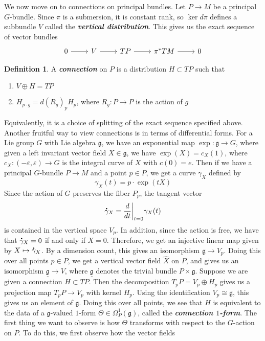 \documentclass[psamsfonts, 12pt]{amsart}
\theoremstyle{definition}
\newtheorem{defn}[thm]{Definition}
\theoremstyle{remark}
\newcommand{\ib}[1]{\textbf{\textit{#1}}}
\newcommand{\g}{\mathfrak{g}}
\newcommand*{\dt}[1]{%
   \accentset{\mbox{\large\bfseries .}}{#1}}
\begin{document}
We now move on to connections on principal bundles. Let $P \to M$ be a principal $G$-bundle.
Since $\pi$ is a submersion, it is constant rank, so $\ker d\pi$ defines a
subbundle $V$ called the \ib{vertical distribution}. This gives us the exact sequence
of vector bundles
\[\begin{tikzcd}
0 \ar[r] & V \ar[r] & TP \ar[r] & \pi^*TM \ar[r] & 0
\end{tikzcd}\]
%
\begin{defn}
A \ib{connection} on $P$ is a distribution $H \subset TP$ such that
\begin{enumerate}
  \item $V \oplus H = TP$
  \item $H_{p \cdot g} = d(R_g)_pH_p$, where $R_g : P \to P$ is the action of $g$
\end{enumerate}
\end{defn}
%
Equivalently, it is a choice of splitting of the exact sequence specified above. Another
fruitful way to view connections is in terms of differential forms.
For a Lie group $G$ with Lie algebra $\g$, we have an exponential map
$\exp : \g \to G$, where given a left invariant vector field $X \in \g$, we have
$\exp(X) = c_X(1)$, where $c_X : (-\varepsilon, \varepsilon) \to G$
is the integral curve of $X$ with $c(0) = e$. Then if we have a principal $G$-bundle
$P \to M$ and a point $p \in P$, we get a curve $\gamma_X$ defined by
\[
\gamma_X(t) = p\cdot \exp(tX)
\]
Since the action of $G$ preserves the fiber $P_p$, the tangent vector
\[
\dt{\gamma}_X = \frac{d}{dt}\bigg\vert_{t=0}\gamma_X(t)
\]
is contained in the vertical space $V_p$. In addition, since the action is free,
we have that $\dt{\gamma}_X = 0$ if and only if $X = 0$. Therefore, we get
an injective linear map given by $X \mapsto \dt{\gamma}_X$. By a dimension count,
this gives an isomorphism $\g \to V_p$. Doing this over all points $p \in P$, we get
a vertical vector field $\widehat{X}$ on $P$, and gives us an isomorphism
$\underline{\g} \to V$, where $\underline{\g}$ denotes the trivial bundle $P \times \g$.
Suppose we are given a connection $H \subset TP$. Then the decomposition
$T_pP = V_p \oplus H_p$ gives us a projection map $T_pP \to V_p$ with kernel $H_p$.
Using the identification $V_p \cong \g$, this gives us an element of $\g$. Doing
this over all points, we see that $H$ is equivalent to the data of a
$\g$-valued $1$-form $\Theta \in \Omega^1_P(\g)$, called the \ib{connection $1$-form}.
The first thing we want to observe is how $\Theta$ transforms with respect to
the $G$-action on $P$. To do this, we first observe how the vector fields
\end{document}
